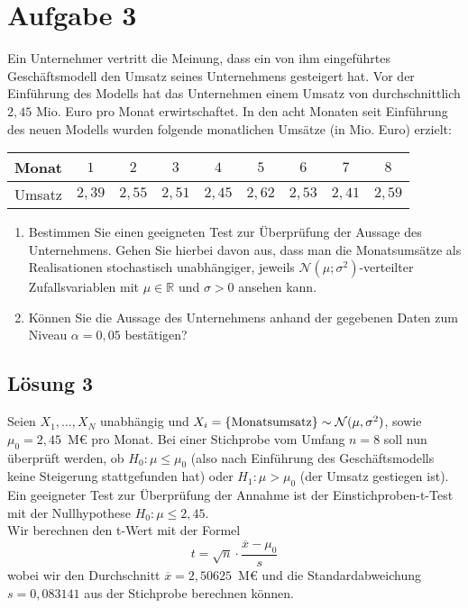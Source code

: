 \documentclass[main.tex]{subfiles}
\begin{document}
\section{Aufgabe 3}
Ein Unternehmer vertritt die Meinung, dass ein von ihm eingeführtes Geschäftsmodell den Umsatz seines Unternehmens gesteigert hat. Vor der Einführung des Modells hat das Unternehmen einem Umsatz von durchschnittlich $2,45$ Mio. Euro pro Monat erwirtschaftet. In den acht Monaten seit Einführung des neuen Modells wurden folgende monatlichen Umsätze (in Mio. Euro) erzielt:
\begin{center}
	\begin{tabular}{|l|c|c|c|c|c|c|c|c|} \hline
		Monat  &    $1$ &    $2$ &    $3$ &    $4$ &    $5$ &    $6$ &    $7$ &    $8$ \\ \hline
		Umsatz & $2,39$ & $2,55$ & $2,51$ & $2,45$ & $2,62$ & $2,53$ & $2,41$ & $2,59$ \\ \hline	
	\end{tabular}
\end{center}
\begin{enumerate}
\item Bestimmen Sie einen geeigneten Test zur Überprüfung der Aussage des Unternehmens. Gehen Sie hierbei davon aus, dass man die Monatsumsätze als Realisationen stochastisch unabhängiger, jeweils $\mathcal{N}(\mu; \sigma^2)$-verteilter Zufallsvariablen mit $\mu \in \mathbb{R}$ und $\sigma > 0$ ansehen kann.
\item Können Sie die Aussage des Unternehmens anhand der gegebenen Daten zum Niveau $\alpha = 0,05$ bestätigen?
\end{enumerate}

\subsection{Lösung 3}

Seien $X_1, \dots, X_N$ unabhängig und $X_i = \{\text{Monatsumsatz}\} \sim \mathcal{N}(\mu, \sigma^2)$, sowie $\mu_0 = 2,45$~M€ pro Monat. Bei einer Stichprobe vom Umfang $n=8$ soll nun überprüft werden, ob $H_0: \mu \leq \mu_0$ (also nach Einführung des Geschäftsmodells keine Steigerung stattgefunden hat) oder $H_1: \mu > \mu_0$ (der Umsatz gestiegen ist).\\

Ein geeigneter Test zur Überprüfung der Annahme ist der Einstichproben-t-Test mit der Nullhypothese $H_0: \mu \leq 2,45$.\\

Wir berechnen den t-Wert mit der Formel $$
	t = \sqrt{n}\cdot \frac{\overline{x}-\mu_0}{s}
$$
wobei wir den Durchschnitt $\overline{x} = 2,50625$~M€ und die Standardabweichung $s = 0,083141$ aus der Stichprobe berechnen können.\\
\end{document}
